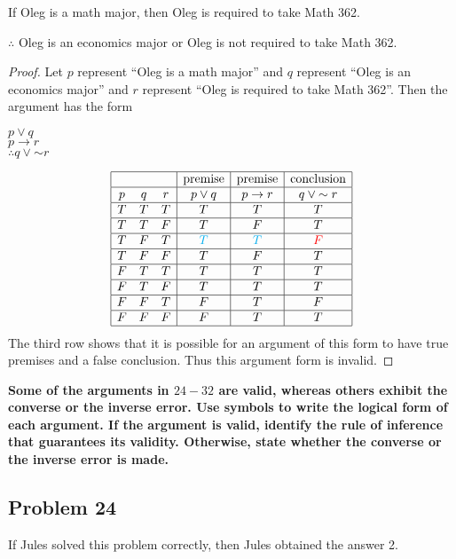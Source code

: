 \documentclass[14pt]{extarticle}
\begin{document}
If Oleg is a math major, then Oleg is required to take Math 362.

$\therefore$ Oleg is an economics major or Oleg is not required to take Math
362.

\begin{proof}
Let $p$ represent “Oleg is a math major” and $q$ represent “Oleg is an economics
major” and $r$ represent ``Oleg is required to take Math 362''. Then the
argument has the form

\begin{center}
$p \vee q$ \\
$p \to r$ \\
$\therefore q \vee {\sim r}$ \\
\end{center}

$$
\begin{array}{|ccc|c|c|c|}
\hline
&&& \text{premise} & \text{premise} & \text{conclusion} \\
\hline
p & q & r & p \vee q & p \to r & q \vee {\sim r} \\
\hline
T & T & T & T & T & T \\
\hline
T & T & F & T & F & T \\
\hline
T & F & T & \color{cyan}T & \color{cyan}T & \color{red}F \\
\hline
T & F & F & T & F & T \\
\hline
F & T & T & T & T & T \\
\hline
F & T & F & T & T & T \\
\hline
F & F & T & F & T & F \\
\hline
F & F & F & F & T & T \\
\hline
\end{array}
$$
The third row shows that it is possible for an argument of this form to have
true premises and a false conclusion. Thus this argument form is invalid.
\end{proof}

{\bf \color{cyan} Some of the arguments in $24-32$ are valid, whereas others
exhibit the converse or the inverse error. Use symbols to write the logical form
of each argument. If the argument is valid, identify the rule of inference that
guarantees its validity. Otherwise, state whether the converse or the inverse
error is made.}

\subsection{Problem 24}
If Jules solved this problem correctly, then Jules obtained the answer 2.
\end{document}
